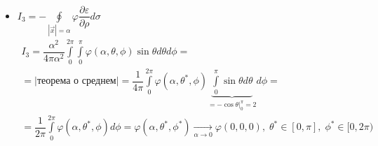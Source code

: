 \begin{Proof}
\begin{itemize}
$$\begin{gathered}
		\end{gathered}$$
		\item $ I_3 = - \oint \limits_{|\vec{x}| = \alpha} \varphi \dfrac{\partial \varepsilon}{\partial \rho} d \sigma $ 
		$$\begin{gathered}
			 I_3 = \dfrac{\alpha^2}{4\pi\alpha^2} \int\limits_{0}^{2\pi} \int\limits_{0}^{\pi} \varphi(\alpha, \theta, \phi) \sin\theta d\theta d \phi = \\
			 = \Big|\text{теорема о среднем}\Big| = 
			 \dfrac{1}{4\pi} \int\limits_{0}^{2\pi} \varphi(\alpha, \theta^{*}, \phi)\underbrace{\int\limits_{0}^{\pi} \sin\theta d\theta }_{= -\cos\theta|_{0}^\pi 
			 = 2} d\phi = \\
			 = \dfrac{1}{2\pi} \int\limits_{0}^{2\pi} \varphi(\alpha, \theta^{*}, \phi) d\phi = \varphi(\alpha, \theta^{*}, \phi^{*}) \underset{\alpha \rightarrow 
			 0}{\longrightarrow} \varphi(0,0,0), \; \theta^{*} \in [0, \pi], \; \phi^{*} \in [0, 2\pi)
		\end{gathered}$$
	\end{itemize}
\end{Proof}







